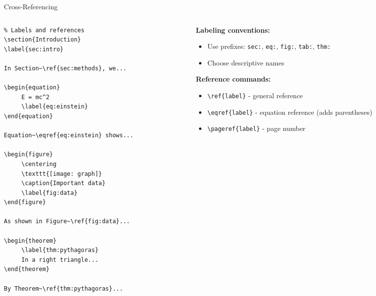 \begin{frame}[fragile]{Cross-Referencing}
     \begin{columns}
          \begin{column}{0.5\textwidth}
               \begin{lstlisting}
% Labels and references
\section{Introduction}
\label{sec:intro}

In Section~\ref{sec:methods}, we...

\begin{equation}
     E = mc^2
     \label{eq:einstein}
\end{equation}

Equation~\eqref{eq:einstein} shows...

\begin{figure}
     \centering
     \texttt{[image: graph]}
     \caption{Important data}
     \label{fig:data}
\end{figure}

As shown in Figure~\ref{fig:data}...

\begin{theorem}
     \label{thm:pythagoras}
     In a right triangle...
\end{theorem}

By Theorem~\ref{thm:pythagoras}...
               \end{lstlisting}
          \end{column}
          
          \begin{column}{0.5\textwidth}
               \textbf{Labeling conventions:}
               \begin{itemize}
                    \item Use prefixes: \texttt{sec:}, \texttt{eq:}, \texttt{fig:}, \texttt{tab:}, \texttt{thm:}
                    \item Choose descriptive names
               \end{itemize}
               
               \textbf{Reference commands:}
               \begin{itemize}
                    \item \texttt{\textbackslash ref\{label\}} - general reference
                    \item \texttt{\textbackslash eqref\{label\}} - equation reference (adds parentheses)
                    \item \texttt{\textbackslash pageref\{label\}} - page number
               \end{itemize}
               

\end{column}
\end{columns}
\end{frame}
